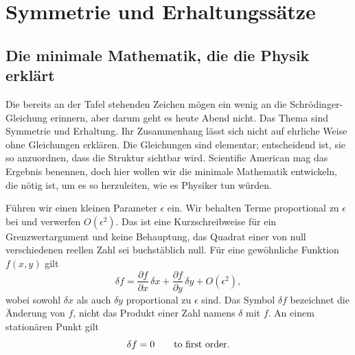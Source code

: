 \chapter{Symmetrie und Erhaltungssätze}


\section{Die minimale Mathematik, die die Physik erklärt}

Die bereits an der Tafel stehenden Zeichen mögen ein wenig an die Schrödinger-Gleichung erinnern, aber darum geht es heute Abend nicht. Das Thema sind Symmetrie und Erhaltung. Ihr Zusammenhang lässt sich nicht auf ehrliche Weise ohne Gleichungen erklären. Die Gleichungen sind elementar; entscheidend ist, sie so anzuordnen, dass die Struktur sichtbar wird. Scientific American mag das Ergebnis benennen, doch hier wollen wir die minimale Mathematik entwickeln, die nötig ist, um es so herzuleiten, wie es Physiker tun würden.

Führen wir einen kleinen Parameter \(\epsilon\) ein. Wir behalten Terme proportional zu \(\epsilon\) bei und verwerfen \(O(\epsilon^2)\). Das ist eine Kurzschreibweise für ein Grenzwertargument und keine Behauptung, das Quadrat einer von null verschiedenen reellen Zahl sei buchstäblich null. Für eine gewöhnliche Funktion \(f(x,y)\) gilt
\begin{equation}
  \delta f
  =\frac{\partial f}{\partial x}\,\delta x
   +\frac{\partial f}{\partial y}\,\delta y
   +O(\epsilon^2),
  \label{eq:first-variation-f}
\end{equation}
wobei sowohl \(\delta x\) als auch \(\delta y\) proportional zu \(\epsilon\) sind. Das Symbol \(\delta f\) bezeichnet die Änderung von \(f\), nicht das Produkt einer Zahl namens \(\delta\) mit \(f\). An einem stationären Punkt gilt
\begin{equation}
  \delta f=0
  \qquad\hbox{to first order.}
  \label{eq:stationary-f}
\end{equation}

